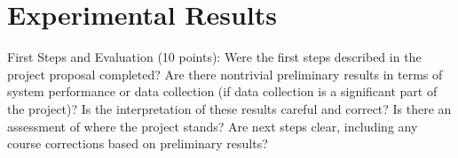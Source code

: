 \section{Experimental Results}
\label{sec:result}

First Steps and Evaluation (10 points): Were the first steps described in the
project proposal completed? Are there nontrivial preliminary results in terms of
system performance or data collection (if data collection is a significant part
of the project)? Is the interpretation of these results careful and correct? Is
there an assessment of where the project stands? Are next steps clear, including
any course corrections based on preliminary results?



